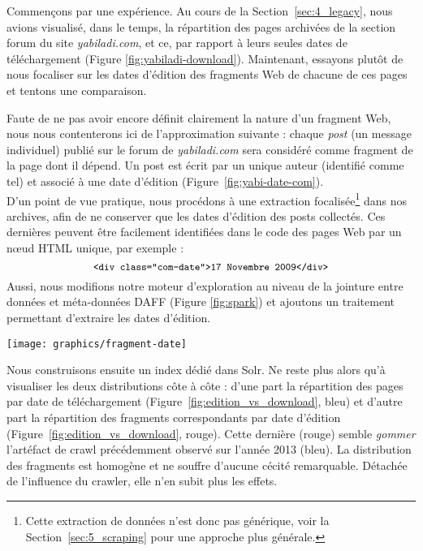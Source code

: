 \documentclass[symmetric,justified,marginals=raggedouter]{tufte-book}
\begin{document}
Commençons par une expérience. Au cours de la Section~\ref{sec:4_legacy}, nous avions visualisé, dans le temps, la répartition des pages archivées de la section forum du site \textit{yabiladi.com}, et ce, par rapport à leurs seules dates de téléchargement (Figure \ref{fig:yabiladi-download}). Maintenant, essayons plutôt de nous focaliser sur les dates d'édition des fragments Web de chacune de ces pages et tentons une comparaison. 

Faute de ne pas avoir encore définit clairement la nature d'un fragment Web, nous nous contenterons ici de l'approximation suivante : chaque \textit{post} (un message individuel) publié sur le forum de \textit{yabiladi.com} sera considéré comme fragment de la page dont il dépend. Un post est écrit par un unique auteur (identifié comme tel) et associé à une date d'édition (Figure~\ref{fig:yabi-date-com}). \\

\noindent D'un point de vue pratique, nous procédons à une extraction focalisée\footnote{\RaggedOuter Cette extraction de données n'est donc pas générique, voir la Section~\ref{sec:5_scraping} pour une approche plus générale.} dans nos archives, afin de ne conserver que les dates d'édition des posts collectés. Ces dernières peuvent être facilement identifiées dans le code des pages Web par un nœud HTML unique, par exemple :
\[
\small
\texttt{<div class="com-date">17 Novembre 2009</div>}
\]
\noindent Aussi, nous modifions notre moteur d'exploration au niveau de la jointure entre données et méta-données DAFF (Figure \ref{fig:spark}) et ajoutons un traitement permettant d'extraire les dates d'édition.

\begin{figure*}%
  \texttt{[image: graphics/fragment-date]}
  \caption{Distribution, pour \textit{yabiladi.com}, du nombre de pages et de fragments archivés par jours et suivant leurs dates de téléchargement (bleu) et d'édition (rouge) respectives}
  \label{fig:edition_vs_download}
\end{figure*}

\noindent Nous construisons ensuite un index dédié dans Solr. Ne reste plus alors qu'à visualiser les deux distributions côte à côte : d'une part la répartition des pages par date de téléchargement (Figure~\ref{fig:edition_vs_download}, bleu) et d'autre part la répartition des fragments correspondants par date d'édition (Figure~\ref{fig:edition_vs_download}, rouge). Cette dernière (rouge) semble \textit{gommer} l'artéfact de crawl précédemment observé sur l'année 2013 (bleu). La distribution des fragments est homogène et ne souffre d'aucune cécité remarquable. Détachée de l'influence du crawler, elle n'en subit plus les effets. 
\end{document}
